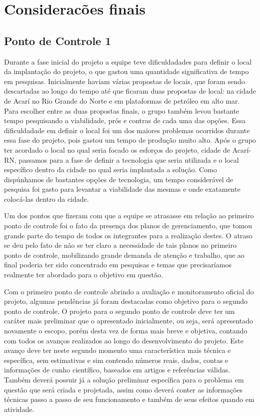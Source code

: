 \chapter{Consideracões finais}

  \section{Ponto de Controle 1}

    Durante a fase inicial do projeto a equipe teve dificuldadades para definir o local da implantação do projeto,
    o que gastou uma quantidade significativa de tempo em pesquisas. Inicialmente haviam várias propostas de locais,
    que foram sendo descartadas ao longo do tempo até que ficaram duas propostas de local: na cidade de Acarí no Rio
    Grande do Norte e em plataformas de petróleo em alto mar. Para escolher entre as duas propostas finais, o grupo
    também levou bastante tempo pesquisando a viabilidade, prós e contras de cada uma das opções. Essa dificuldadade
    em definir o local foi um dos maiores problemas ocorridos durante essa fase do projeto, pois gastou um tempo de
    produção muito alto. Após o grupo ter acordado o local no qual seria focado os esforços do projeto, cidade de Acarí-RN,
    passamos para a fase de definir a tecnologia que seria utilizada e o local específico dentro da cidade no qual seria
    implantada a solução. Como dispúnhamos de bastantes opções de tecnologia, um tempo considerável de pesquisa foi gasto
    para levantar a viabilidade das mesmas e onde exatamente colocá-las dentro da cidade. 

    Um dos pontos que fizeram com que a equipe se atrasasse em relação ao primeiro ponto de controle foi o fato da
    presença dos planos de gerenciamento,  que tomou grande parte do tempo de todos os integrantes para a realização
    destes. O atraso se deu pelo fato de não se ter claro a necessidade de tais planos no primeiro ponto de controle,
    mobilizando grande demanda de atenção e trabalho, que ao final poderia ter sido concentrado em pesquisas e temas 
    que precisaríamos realmente ter abordado para o objetivo em questão.

    Com o primeiro ponto de controle abrindo a avaliação e monitoramento oficial do projeto, algumas pendências já
    foram destacadas como objetivo para o segundo ponto de controle. O projeto para o segundo ponto de controle deve
    ter um caráter mais preliminar que o apresentado inicialmente, ou seja, será apresentado novamente o escopo, porém
    desta vez de forma mais breve e objetiva, contando com todos os avanços realizados ao longo do desenvolvimento do 
    projeto. Este avanço deve ter neste segundo momento uma característica mais técnica e específica, sem estimativas
    e sim contendo números reais, dados, contas e informações de cunho científico, baseados em artigos e referências válidas.
    Também deverá possuir já a solução preliminar específica para o problema em questão que será criada e projetada,
    assim como deverá conter as informações técnicas passo a passo de seu funcionamento e também de seus efeitos quando
    em atividade.

